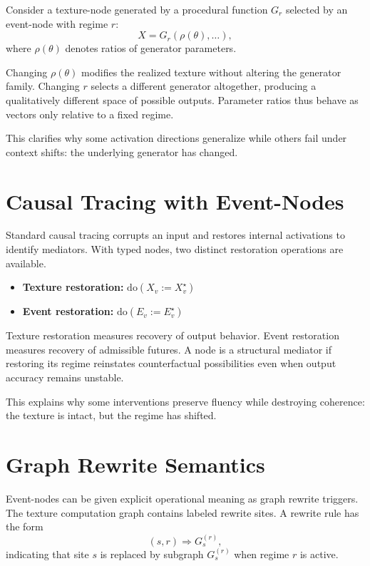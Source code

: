 \documentclass[11pt]{article}
\newcommand{\Do}{\mathrm{do}}
\begin{document}
Consider a texture-node generated by a procedural function $G_r$ selected by an
event-node with regime $r$:
\[
X = G_r(\rho(\theta), \ldots),
\]
where $\rho(\theta)$ denotes ratios of generator parameters.

Changing $\rho(\theta)$ modifies the realized texture without altering the
generator family. Changing $r$ selects a different generator altogether, producing
a qualitatively different space of possible outputs. Parameter ratios thus behave
as vectors only relative to a fixed regime.

This clarifies why some activation directions generalize while others fail under
context shifts: the underlying generator has changed.

\section{Causal Tracing with Event-Nodes}

Standard causal tracing corrupts an input and restores internal activations to
identify mediators. With typed nodes, two distinct restoration operations are
available.

\begin{itemize}
\item \textbf{Texture restoration:} $\Do(X_v := X_v^\star)$
\item \textbf{Event restoration:} $\Do(E_v := E_v^\star)$
\end{itemize}

Texture restoration measures recovery of output behavior. Event restoration
measures recovery of admissible futures. A node is a structural mediator if
restoring its regime reinstates counterfactual possibilities even when output
accuracy remains unstable.

This explains why some interventions preserve fluency while destroying coherence:
the texture is intact, but the regime has shifted.

\section{Graph Rewrite Semantics}

Event-nodes can be given explicit operational meaning as graph rewrite triggers.
The texture computation graph contains labeled rewrite sites. A rewrite rule has
the form
\[
(s, r) \Rightarrow G_s^{(r)},
\]
indicating that site $s$ is replaced by subgraph $G_s^{(r)}$ when regime $r$ is
active.
\end{document}
